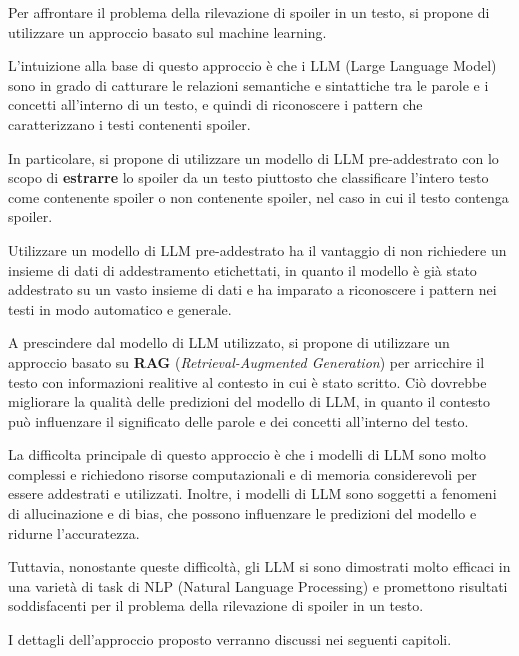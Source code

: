 Per affrontare il problema della rilevazione di spoiler in
un testo, si propone di utilizzare un approccio basato sul
machine learning.

L'intuizione alla base di questo approccio è che i LLM
(Large Language Model) sono in grado di catturare le
relazioni semantiche e sintattiche tra le parole e i
concetti all'interno di un testo, e quindi di riconoscere i
pattern che caratterizzano i testi contenenti spoiler.

In particolare, si propone di utilizzare un modello di LLM
pre-addestrato con lo scopo di \textbf{estrarre} lo spoiler
da un testo piuttosto che classificare l'intero testo come
contenente spoiler o non contenente spoiler, nel caso in
cui il testo contenga spoiler.

Utilizzare un modello di LLM pre-addestrato ha il vantaggio
di non richiedere un insieme di dati di addestramento
etichettati, in quanto il modello è già stato addestrato su
un vasto insieme di dati e ha imparato a riconoscere i
pattern nei testi in modo automatico e generale.

A prescindere dal modello di LLM utilizzato, si propone di
utilizzare un approccio basato su \textbf{RAG}
(\textit{Retrieval-Augmented
  Generation})\cite{lewis2020retrievalaugmented} per
arricchire il testo con informazioni realitive al contesto
in cui è stato scritto.
Ciò dovrebbe migliorare la qualità delle predizioni del
modello di LLM, in quanto il contesto può influenzare il
significato delle parole e dei concetti all'interno del
testo.

La difficolta principale di questo approccio è che i
modelli di LLM sono molto complessi e richiedono risorse
computazionali e di memoria considerevoli per essere
addestrati e utilizzati.
Inoltre, i modelli di LLM sono soggetti a fenomeni di
allucinazione e di bias, che possono influenzare le
predizioni del modello e ridurne l'accuratezza.

Tuttavia, nonostante queste difficoltà, gli LLM si sono
dimostrati molto efficaci in una varietà di task di NLP
(Natural Language Processing) e promettono risultati
soddisfacenti per il problema della rilevazione di spoiler
in un testo.

I dettagli dell'approccio proposto verranno discussi nei
seguenti capitoli.
